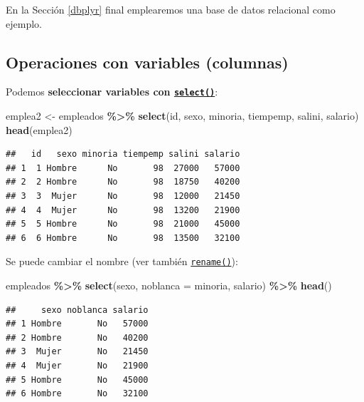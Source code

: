 \documentclass[
]{book}
\newenvironment{Shaded}{\begin{snugshade}}{\end{snugshade}}
\newcommand{\AttributeTok}[1]{\textcolor[rgb]{0.13,0.29,0.53}{#1}}
\newcommand{\FunctionTok}[1]{\textcolor[rgb]{0.13,0.29,0.53}{\textbf{#1}}}
\newcommand{\NormalTok}[1]{#1}
\newcommand{\OtherTok}[1]{\textcolor[rgb]{0.56,0.35,0.01}{#1}}
\newcommand{\SpecialCharTok}[1]{\textcolor[rgb]{0.81,0.36,0.00}{\textbf{#1}}}
\begin{document}
En la Sección \ref{dbplyr} final emplearemos una base de datos relacional como ejemplo.

\hypertarget{dplyr-variables}{%
\subsection{Operaciones con variables (columnas)}\label{dplyr-variables}}

Podemos \textbf{seleccionar variables con \href{https://dplyr.tidyverse.org/reference/select.html}{\texttt{select()}}}:

\begin{Shaded}
\begin{Highlighting}[]
\NormalTok{emplea2 }\OtherTok{\textless{}{-}}\NormalTok{ empleados }\SpecialCharTok{\%\textgreater{}\%} \FunctionTok{select}\NormalTok{(id, sexo, minoria, tiempemp, }
\NormalTok{                                salini, salario)}
\FunctionTok{head}\NormalTok{(emplea2)}
\end{Highlighting}
\end{Shaded}

\begin{verbatim}
##   id   sexo minoria tiempemp salini salario
## 1  1 Hombre      No       98  27000   57000
## 2  2 Hombre      No       98  18750   40200
## 3  3  Mujer      No       98  12000   21450
## 4  4  Mujer      No       98  13200   21900
## 5  5 Hombre      No       98  21000   45000
## 6  6 Hombre      No       98  13500   32100
\end{verbatim}

Se puede cambiar el nombre (ver también \href{https://dplyr.tidyverse.org/reference/rename.html}{\texttt{rename()}}):

\begin{Shaded}
\begin{Highlighting}[]
\NormalTok{empleados }\SpecialCharTok{\%\textgreater{}\%} \FunctionTok{select}\NormalTok{(sexo, }\AttributeTok{noblanca =}\NormalTok{ minoria, salario) }\SpecialCharTok{\%\textgreater{}\%} \FunctionTok{head}\NormalTok{()}
\end{Highlighting}
\end{Shaded}

\begin{verbatim}
##     sexo noblanca salario
## 1 Hombre       No   57000
## 2 Hombre       No   40200
## 3  Mujer       No   21450
## 4  Mujer       No   21900
## 5 Hombre       No   45000
## 6 Hombre       No   32100
\end{verbatim}
\end{document}
